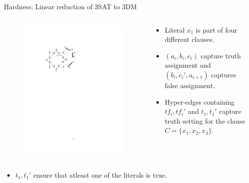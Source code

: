 \documentclass{beamer}
\begin{document}
\begin{frame}{Hardness: Linear reduction of 3SAT to 3DM}
	\begin{columns}
		\begin{column}{0.48\textwidth}
			\vspace{-40pt}\begin{figure}
				\centering
				\includegraphics[trim = 120 500 300 120, clip, width=\linewidth]{figures/deDuplication/pccHardQuery.pdf}
			\end{figure}
		\end{column}

		\begin{column}{0.48\textwidth}
			\begin{itemize}
				\item Literal $x_1$ is part of four different clauses.
				\item $(a_i, b_i, c_i)$ capture truth assignment and $(b_i, c_i', a_{i+1})$ captures false assignment.
				\item Hyper-edges containing $tf_i, tf_i'$ and $t_1, t_1'$ capture truth setting for the clause $C = \{x_1, x_2, x_3\}$.
				
			\end{itemize}
		\end{column}
	\end{columns}	
	\begin{itemize}
		\item $t_1, t_1'$ ensure that atleast one of the literals is true. 
	\end{itemize}
\end{frame}
\end{document}
